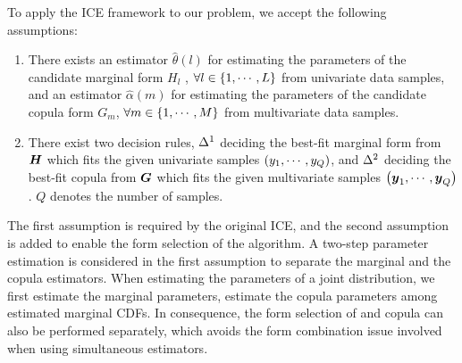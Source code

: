 To apply the ICE framework to our problem, we accept the following assumptions:
\begin{enumerate}
    \item There exists an estimator $\hat{\theta}(l)$ for estimating the parameters of the candidate marginal form $H_l$ , $\forall l\in\left\{1,\cdots,L\right\}$ from univariate data samples, and an estimator $\hat{\alpha}(m)$ for estimating the parameters of the
    candidate copula form $G_m$, $\forall m\in\left\{1,\cdots,M\right\}$ from multivariate data samples.
    \item There exist two decision rules, $\blueC{\Delta}^1$ deciding the best-fit marginal form from $\boldsymbol{H}$ which fits the given univariate samples $\left(y_1,\cdots,y_Q\right)$, and $\blueC{\Delta}^2$ deciding the best-fit copula from $\boldsymbol{G}$ which fits the given multivariate samples $\left(\boldsymbol{y}_1,\cdots,\boldsymbol{y}_Q\right)$. $Q$ denotes the number of samples.
\end{enumerate}

The first assumption is required by the original ICE, and the second assumption is added to enable the form selection of the algorithm. A two-step parameter estimation is considered in the first assumption to separate the marginal and the copula estimators. When estimating the parameters of a joint distribution, we first  estimate the marginal parameters,  estimate the copula parameters among estimated marginal CDFs. In consequence, the form selection of  and copula can also be performed separately, which avoids the form combination issue involved when using simultaneous estimators.


